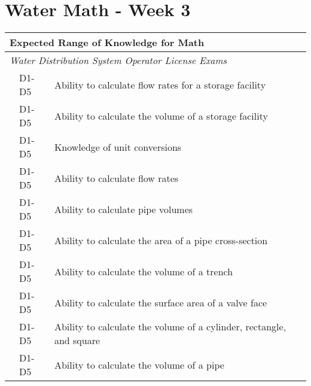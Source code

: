 \chapter{Water Math - Week 3}



\begin{table}[H]
\begin{tabular}{| m{1cm} | m{1cm} | m{12cm} |}
\hline
\multicolumn{3}{|l|}{\textbf{Expected   Range of Knowledge for Math}}                                                                      \\ \hline
\multicolumn{3}{|l|}{\textit{Water   Distribution System Operator License Exams}}                                                          \\ \hline
\multicolumn{1}{l|}{} & \multicolumn{1}{l|}{D1-D5} & Ability to calculate   flow rates for a storage facility                     \\ \cline{2-3} 
\multicolumn{1}{l|}{} & \multicolumn{1}{l|}{D1-D5} & Ability to calculate   the volume of a storage facility                      \\ \cline{2-3} 
\multicolumn{1}{l|}{} & \multicolumn{1}{l|}{D1-D5} & Knowledge of unit   conversions                                              \\ \cline{2-3} 
\multicolumn{1}{l|}{} & \multicolumn{1}{l|}{D1-D5} & Ability to calculate   flow rates                                            \\ \cline{2-3} 
\multicolumn{1}{l|}{} & \multicolumn{1}{l|}{D1-D5} & Ability to calculate   pipe volumes                                          \\ \cline{2-3} 
\multicolumn{1}{l|}{} & \multicolumn{1}{l|}{D1-D5} & Ability to calculate   the area of a pipe cross-section                      \\ \cline{2-3}
\multicolumn{1}{l|}{} & \multicolumn{1}{l|}{D1-D5} & Ability to calculate   the volume of a trench                                \\ \cline{2-3}  
\multicolumn{1}{l|}{} & \multicolumn{1}{l|}{D1-D5} & Ability to calculate   the surface area of a valve face                      \\ \cline{2-3} 
\multicolumn{1}{l|}{} & \multicolumn{1}{l|}{D1-D5} & Ability to calculate   the volume of a cylinder, rectangle, and square       \\ \cline{2-3} 
\multicolumn{1}{l|}{} & \multicolumn{1}{l|}{D1-D5} & Ability to calculate   the volume of a pipe                                  \\ \cline{2-3} 

\end{tabular}
\end{table}
